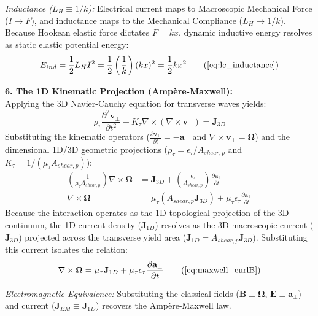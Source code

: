 \textit{Inductance ($L_H \equiv 1/k$):} Electrical current maps to Macroscopic Mechanical Force ($I \to F$), and inductance maps to the Mechanical Compliance ($L_H \to 1/k$). Because Hookean elastic force dictates $F = kx$, dynamic inductive energy resolves as static elastic potential energy:
\begin{equation}
    E_{ind} = \frac{1}{2} L_H I^2 = \frac{1}{2} \left(\frac{1}{k}\right) (kx)^2 = \frac{1}{2} k x^2 \tag{\ref{eq:lc_inductance}}
\end{equation}

\textbf{6. The 1D Kinematic Projection (Ampère-Maxwell):} \\
Applying the 3D Navier-Cauchy equation for transverse waves yields:
\begin{equation}
    \rho_{\tau} \frac{\partial^2 \mathbf{v}_{\perp}}{\partial t^2} + K_\tau \nabla \times (\nabla \times \mathbf{v}_{\perp}) = \mathbf{J}_{3D} \nonumber
\end{equation}
Substituting the kinematic operators ($\frac{\partial \mathbf{v}_{\perp}}{\partial t} = -\mathbf{a}_\perp$ and $\nabla \times \mathbf{v}_{\perp} = \boldsymbol{\Omega}$) and the dimensional 1D/3D geometric projections ($\rho_{\tau} = \epsilon_{\tau}/A_{shear, p}$ and $K_\tau = 1/(\mu_{\tau} A_{shear, p})$):
\begin{align}
    \left( \frac{1}{\mu_{\tau} A_{shear, p}} \right) \nabla \times \boldsymbol{\Omega} &= \mathbf{J}_{3D} + \left( \frac{\epsilon_{\tau}}{A_{shear, p}} \right) \frac{\partial \mathbf{a}_\perp}{\partial t} \nonumber \\
    \nabla \times \boldsymbol{\Omega} &= \mu_{\tau} (A_{shear, p} \mathbf{J}_{3D}) + \mu_{\tau} \epsilon_{\tau} \frac{\partial \mathbf{a}_\perp}{\partial t} \nonumber
\end{align}
Because the interaction operates as the 1D topological projection of the 3D continuum, the 1D current density ($\mathbf{J}_{1D}$) resolves as the 3D macroscopic current ($\mathbf{J}_{3D}$) projected across the transverse yield area ($\mathbf{J}_{1D} = A_{shear, p} \mathbf{J}_{3D}$). Substituting this current isolates the relation:
\begin{equation}
    \nabla \times \boldsymbol{\Omega} = \mu_{\tau} \mathbf{J}_{1D} + \mu_{\tau} \epsilon_{\tau} \frac{\partial \mathbf{a}_\perp}{\partial t} \tag{\ref{eq:maxwell_curlB}}
\end{equation}

\textit{Electromagnetic Equivalence:} Substituting the classical fields ($\mathbf{B} \equiv \boldsymbol{\Omega}$, $\mathbf{E} \equiv \mathbf{a}_\perp$) and current ($\mathbf{J}_{EM} \equiv \mathbf{J}_{1D}$) recovers the Ampère-Maxwell law.

